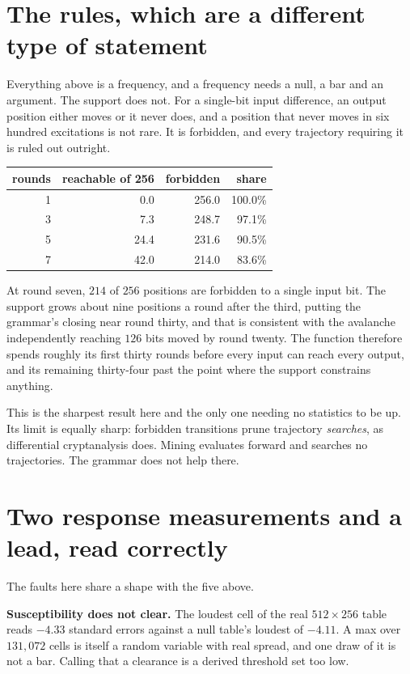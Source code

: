 \section{The rules, which are a different type of statement}

Everything above is a frequency, and a frequency needs a null, a bar and an argument. The support does not. For a single-bit input difference, an output position either moves or it never does, and a position that never moves in six hundred excitations is not rare. It is forbidden, and every trajectory requiring it is ruled out outright.

\begin{center}
\begin{tabular}{@{}rrrr@{}}
\toprule
rounds & reachable of 256 & forbidden & share \\
\midrule
1 & 0.0 & 256.0 & 100.0\% \\
3 & 7.3 & 248.7 & 97.1\% \\
5 & 24.4 & 231.6 & 90.5\% \\
7 & 42.0 & 214.0 & 83.6\% \\
\bottomrule
\end{tabular}
\end{center}

At round seven, \(214\) of \(256\) positions are forbidden to a single input bit. The support grows about nine positions a round after the third, putting the grammar's closing near round thirty, and that is consistent with the avalanche independently reaching \(126\) bits moved by round twenty. The function therefore spends roughly its first thirty rounds before every input can reach every output, and its remaining thirty-four past the point where the support constrains anything.

This is the sharpest result here and the only one needing no statistics to be up. Its limit is equally sharp: forbidden transitions prune trajectory \emph{searches}, as differential cryptanalysis does. Mining evaluates forward and searches no trajectories. The grammar does not help there.

\section{Two response measurements and a lead, read correctly}

The faults here share a shape with the five above.

\textbf{Susceptibility does not clear.} The loudest cell of the real \(512 \times 256\) table reads \(-4.33\) standard errors against a null table's loudest of \(-4.11\). A max over \(131{,}072\) cells is itself a random variable with real spread, and one draw of it is not a bar. Calling that a clearance is a derived threshold set too low.

